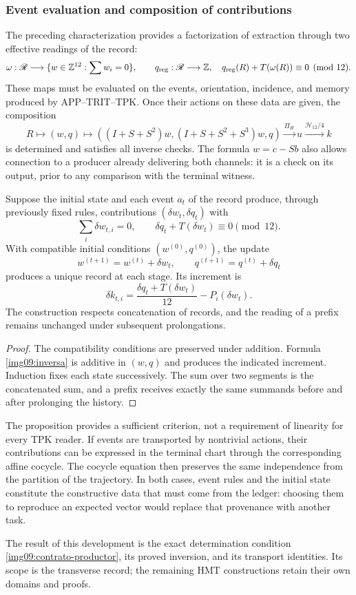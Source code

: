 \subsubsection{Event evaluation and composition of contributions}

The preceding characterization provides a factorization of extraction through two
effective readings of the record:
\begin{equation}
 \omega:\mathscr R\longrightarrow
 \{w\in\mathbb Z^{12}:\sum w_i=0\},\qquad
 q_{\rm reg}:\mathscr R\longrightarrow\mathbb Z,
 \quad q_{\rm reg}(R)+T(\omega(R))\equiv0\pmod {12}.
 \label{img09:contrato-productor}
\end{equation}
These maps must be evaluated on the events, orientation,
incidence, and memory produced by APP--TRIT--TPK. Once their
actions on these data are given, the composition
\[
 R\longmapsto(w,q)\longmapsto
 ((I+S+S^2)w,(I+S+S^2+S^3)w,q)
 \xrightarrow{\Pi_H}u\xrightarrow{\mathcal H_{12}/4}k
\]
is determined and satisfies all inverse checks. The formula
$w=c-Sb$ also allows connection to a producer already delivering both
channels: it is a check on its output, prior to any comparison
with the terminal witness.

\begin{proposition}
\label{img09:acumulacion}
Suppose the initial state and each event $a_t$ of the record
produce, through previously fixed rules, contributions
$(\delta w_t,\delta q_t)$ with
\[
 \sum_i\delta w_{t,i}=0,\qquad
 \delta q_t+T(\delta w_t)\equiv0\pmod {12}.
\]
With compatible initial conditions $(w^{(0)},q^{(0)})$, the
update
\[
 w^{(t+1)}=w^{(t)}+\delta w_t,\qquad
 q^{(t+1)}=q^{(t)}+\delta q_t
\]
produces a unique record at each stage. Its increment is
\[
 \delta k_{t,i}=
 \frac{\delta q_t+T(\delta w_t)}{12}-P_i(\delta w_t).
\]
The construction respects concatenation of records, and the reading
of a prefix remains unchanged under subsequent prolongations.
\end{proposition}
\begin{proof}
The compatibility conditions are preserved under addition. Formula
\eqref{img09:inversa} is additive in $(w,q)$ and produces the
indicated increment. Induction fixes each state successively.
The sum over two segments is the concatenated sum, and a prefix receives
exactly the same summands before and after prolonging the history.
\end{proof}

The proposition provides a sufficient criterion, not a requirement of
linearity for every TPK reader. If events are transported by nontrivial
actions, their contributions can be expressed in the terminal chart
through the corresponding affine cocycle. The cocycle equation then
preserves the same independence from the partition of the trajectory.
In both cases, event rules and the initial state constitute the
constructive data that must come from the ledger: choosing them to
reproduce an expected vector would replace that provenance with another task.

The result of this development is the exact determination condition
\eqref{img09:contrato-productor}, its proved inversion, and its transport
identities. Its scope is the transverse record; the remaining
HMT constructions retain their own domains and proofs.
